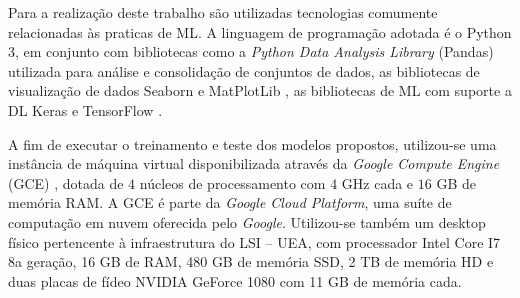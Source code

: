 
Para a realização deste trabalho são utilizadas tecnologias comumente relacionadas às praticas de ML. A linguagem de programação adotada é o Python 3, em conjunto com bibliotecas como a \emph{Python Data Analysis Library} (Pandas) \cite{pandas} utilizada para análise e consolidação de conjuntos de dados, as bibliotecas de visualização de dados Seaborn \cite{seaborn} e MatPlotLib \cite{matplotlib}, as bibliotecas de ML com suporte a DL Keras \cite{keras} e TensorFlow \cite{tensorflow}.

A fim de executar o treinamento e teste dos modelos propostos, utilizou-se uma instância de máquina virtual disponibilizada através da \emph{Google Compute Engine} (GCE) \cite{gce}, dotada de $4$ núcleos de processamento com $4$ GHz cada e $16$ GB de memória RAM. A GCE é parte da \emph{Google Cloud Platform}, uma suíte de computação em nuvem oferecida pelo \emph{Google}. Utilizou-se também um desktop físico pertencente à infraestrutura do LSI -- UEA, com processador Intel Core I7 8a geração, 16 GB de RAM, 480 GB de memória SSD, 2 TB de memória HD e duas placas de fídeo NVIDIA GeForce 1080 com 11 GB de memória cada.
